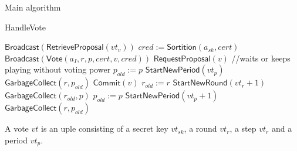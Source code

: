 \documentclass[10pt,a4paper]{article}
\begin{document}
\begin{section}{Main algorithm}
\begin{subsection}{HandleVote}
\begin{algorithm}[H]
\begin{algorithmic}[1]
                    \State $\mathsf{Broadcast}(\mathsf{RetrieveProposal}(vt_v))$
                \EndIf
                        \State $cred := 
                        \mathsf{Sortition}(a_{sk}, cert)$
                            \State $\mathsf{Broadcast}(\mathsf{Vote}(a_I, r, p, cert, v, cred))$
                        \EndIf
                    \EndFor
                \EndIf
                        \State $\mathsf{RequestProposal}(v)$ //waits or keeps playing without voting power
                            \State $p_{old} := p$
                            \State $\mathsf{StartNewPeriod}(vt_p)$
                            \State $\mathsf{GarbageCollect}(r, p_{old})$
                        \EndIf
                    \EndIf
                    \State $\mathsf{Commit}(v)$  %
                    \State $r_{old} := r$
                    \State $\mathsf{StartNewRound}(vt_r+1)$
                    \State $\mathsf{GarbageCollect}(r_{old}, p)$
                \EndIf
                    \State $p_{old} := p$
                    \State $\mathsf{StartNewPeriod}(vt_p + 1)$
                    \State $\mathsf{GarbageCollect}(r, p_{old})$
                \EndIf
            \EndIf

        \EndFunction
        \end{algorithmic}
    \end{algorithm}
    
A vote $vt$ is an uple consisting of a secret key $vt_{sk}$, a round $vt_r$, a step $vt_r$ and a period $vt_p$.
    

\end{subsection}
\end{section}
\end{document}
